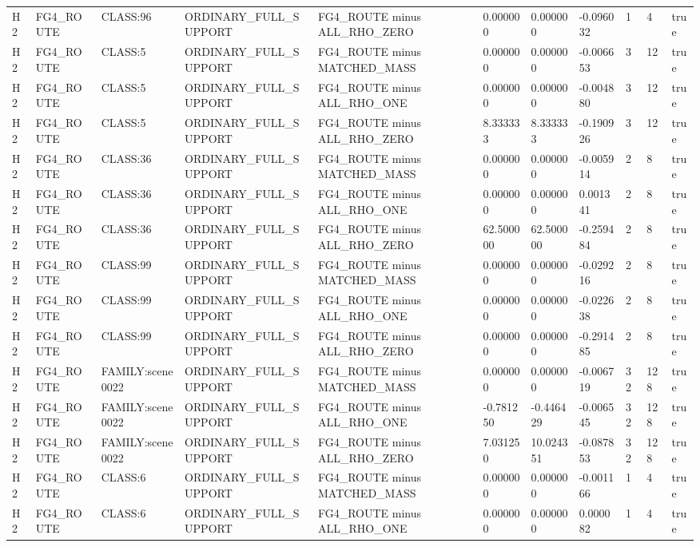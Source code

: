 \begin{tabular}{lllllllllll}
H2 & FG4\_ROUTE & CLASS:96 & ORDINARY\_FULL\_SUPPORT & FG4\_ROUTE minus ALL\_RHO\_ZERO & 0.000000 & 0.000000 & -0.096032 & 1 & 4 & true \\
H2 & FG4\_ROUTE & CLASS:5 & ORDINARY\_FULL\_SUPPORT & FG4\_ROUTE minus MATCHED\_MASS & 0.000000 & 0.000000 & -0.006653 & 3 & 12 & true \\
H2 & FG4\_ROUTE & CLASS:5 & ORDINARY\_FULL\_SUPPORT & FG4\_ROUTE minus ALL\_RHO\_ONE & 0.000000 & 0.000000 & -0.004880 & 3 & 12 & true \\
H2 & FG4\_ROUTE & CLASS:5 & ORDINARY\_FULL\_SUPPORT & FG4\_ROUTE minus ALL\_RHO\_ZERO & 8.333333 & 8.333333 & -0.190926 & 3 & 12 & true \\
H2 & FG4\_ROUTE & CLASS:36 & ORDINARY\_FULL\_SUPPORT & FG4\_ROUTE minus MATCHED\_MASS & 0.000000 & 0.000000 & -0.005914 & 2 & 8 & true \\
H2 & FG4\_ROUTE & CLASS:36 & ORDINARY\_FULL\_SUPPORT & FG4\_ROUTE minus ALL\_RHO\_ONE & 0.000000 & 0.000000 & 0.001341 & 2 & 8 & true \\
H2 & FG4\_ROUTE & CLASS:36 & ORDINARY\_FULL\_SUPPORT & FG4\_ROUTE minus ALL\_RHO\_ZERO & 62.500000 & 62.500000 & -0.259484 & 2 & 8 & true \\
H2 & FG4\_ROUTE & CLASS:99 & ORDINARY\_FULL\_SUPPORT & FG4\_ROUTE minus MATCHED\_MASS & 0.000000 & 0.000000 & -0.029216 & 2 & 8 & true \\
H2 & FG4\_ROUTE & CLASS:99 & ORDINARY\_FULL\_SUPPORT & FG4\_ROUTE minus ALL\_RHO\_ONE & 0.000000 & 0.000000 & -0.022638 & 2 & 8 & true \\
H2 & FG4\_ROUTE & CLASS:99 & ORDINARY\_FULL\_SUPPORT & FG4\_ROUTE minus ALL\_RHO\_ZERO & 0.000000 & 0.000000 & -0.291485 & 2 & 8 & true \\
H2 & FG4\_ROUTE & FAMILY:scene0022 & ORDINARY\_FULL\_SUPPORT & FG4\_ROUTE minus MATCHED\_MASS & 0.000000 & 0.000000 & -0.006719 & 32 & 128 & true \\
H2 & FG4\_ROUTE & FAMILY:scene0022 & ORDINARY\_FULL\_SUPPORT & FG4\_ROUTE minus ALL\_RHO\_ONE & -0.781250 & -0.446429 & -0.006545 & 32 & 128 & true \\
H2 & FG4\_ROUTE & FAMILY:scene0022 & ORDINARY\_FULL\_SUPPORT & FG4\_ROUTE minus ALL\_RHO\_ZERO & 7.031250 & 10.024351 & -0.087853 & 32 & 128 & true \\
H2 & FG4\_ROUTE & CLASS:6 & ORDINARY\_FULL\_SUPPORT & FG4\_ROUTE minus MATCHED\_MASS & 0.000000 & 0.000000 & -0.001166 & 1 & 4 & true \\
H2 & FG4\_ROUTE & CLASS:6 & ORDINARY\_FULL\_SUPPORT & FG4\_ROUTE minus ALL\_RHO\_ONE & 0.000000 & 0.000000 & 0.000082 & 1 & 4 & true \\

\end{tabular}
